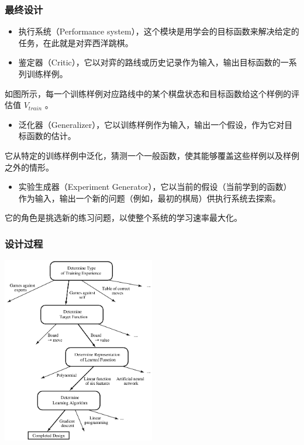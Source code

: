 \documentclass{beamer}
\begin{document}
\begin{frame}
\frametitle{最终设计}
\label{sec-4-10}

\begin{itemize}
\item 执行系统（Performance system），这个模块是用学会的目标函数来解决给定的任务，在此就是对弈西洋跳棋。
\end{itemize}

\begin{itemize}
\item 鉴定器（Critic），它以对弈的路线或历史记录作为输入，输出目标函数的一系列训练样例。
\end{itemize}
如图所示，每一个训练样例对应路线中的某个棋盘状态和目标函数给这个样例的评估值 $V_{train}$ 。

\begin{itemize}
\item 泛化器（Generalizer），它以训练样例作为输入，输出一个假设，作为它对目标函数的估计。
\end{itemize}
它从特定的训练样例中泛化，猜测一个一般函数，使其能够覆盖这些样例以及样例之外的情形。

\begin{itemize}
\item 实验生成器（Experiment Generator），它以当前的假设（当前学到的函数）作为输入，输出一个新的问题（例如，最初的棋局）供执行系统去探索。
\end{itemize}
它的角色是挑选新的练习问题，以使整个系统的学习速率最大化。
\end{frame}
\begin{frame}
\frametitle{设计过程}
\label{sec-4-11}

\center
\includegraphics[width=0.5\textwidth]{./image/intro-f1.png}
\end{frame}
\end{document}
